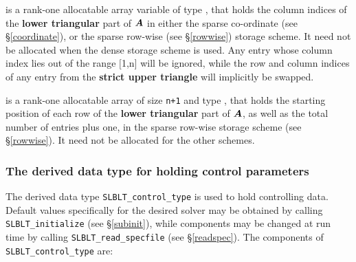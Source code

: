 \documentclass{galahad}
\newcommand{\packagename}{SLBLT}
\begin{document}
\begin{description}
 is a rank-one allocatable array variable of type \integer,
that holds the column indices of the {\bf lower triangular} part of
${\bm{A}}$ in either the sparse co-ordinate
(see \S\ref{coordinate}), or the sparse row-wise
(see \S\ref{rowwise}) storage scheme.
It need not be allocated when the dense
storage scheme is used.
Any entry whose column index lies out of the range $[$1,n$]$ will be ignored,
while the row and column indices of any entry from the
{\bf strict upper triangle} will implicitly be swapped.

 is a rank-one allocatable array of size {\tt n+1} and type
\integer, that holds the starting position of
each row of the {\bf lower triangular} part of ${\bm{A}}$, as well
as the total number of entries plus one, in the sparse row-wise storage
scheme (see \S\ref{rowwise}). It need not be allocated for the
other schemes.

\end{description}


\subsubsection{The derived data type for holding control
 parameters}\label{typecontrol}
The derived data type
{\tt \packagename\_control\_type}
is used to hold controlling data.
Default values specifically for the desired solver
may be obtained by calling
{\tt \packagename\_initialize}
(see \S\ref{subinit}),
while components may be changed at run time by calling
{\tt \packagename\_read\-\_specfile}
(see \S\ref{readspec}).
The components of
{\tt \packagename\_control\_type}
are:
\end{document}
